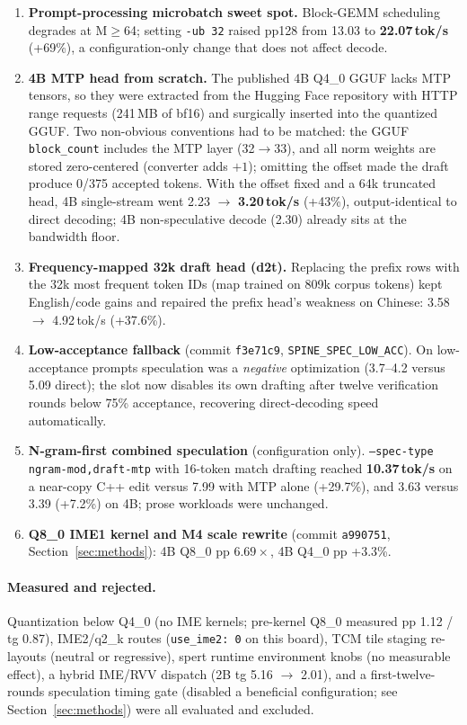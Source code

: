 \documentclass[10pt,twocolumn]{article}
\begin{document}
\begin{enumerate}[label=\textbf{Step \arabic*.},leftmargin=3.2em]
\item \textbf{Prompt-processing microbatch sweet spot.} Block-GEMM scheduling degrades at M$\geq$64; setting \texttt{-ub 32} raised pp128 from 13.03 to \textbf{22.07\,tok/s} (+69\%), a configuration-only change that does not affect decode.
\item \textbf{4B MTP head from scratch.} The published 4B Q4\_0 GGUF lacks MTP tensors, so they were extracted from the Hugging Face repository with HTTP range requests (241\,MB of bf16) and surgically inserted into the quantized GGUF. Two non-obvious conventions had to be matched: the GGUF \texttt{block\_count} includes the MTP layer (32$\to$33), and all norm weights are stored zero-centered (converter adds $+1$); omitting the offset made the draft produce 0/375 accepted tokens. With the offset fixed and a 64k truncated head, 4B single-stream went 2.23 $\to$ \textbf{3.20\,tok/s} (+43\%), output-identical to direct decoding; 4B non-speculative decode (2.30) already sits at the bandwidth floor.
\item \textbf{Frequency-mapped 32k draft head (d2t).} Replacing the prefix rows with the 32k most frequent token IDs (map trained on 809k corpus tokens) kept English/code gains and repaired the prefix head's weakness on Chinese: 3.58 $\to$ 4.92\,tok/s (+37.6\%).
\item \textbf{Low-acceptance fallback} (commit \texttt{f3e71c9}, \texttt{SPINE\_SPEC\_LOW\_ACC}). On low-acceptance prompts speculation was a \emph{negative} optimization (3.7--4.2 versus 5.09 direct); the slot now disables its own drafting after twelve verification rounds below 75\% acceptance, recovering direct-decoding speed automatically.
\item \textbf{N-gram-first combined speculation} (configuration only). \texttt{--spec-type ngram-mod,draft-mtp} with 16-token match drafting reached \textbf{10.37\,tok/s} on a near-copy C++ edit versus 7.99 with MTP alone (+29.7\%), and 3.63 versus 3.39 (+7.2\%) on 4B; prose workloads were unchanged.
\item \textbf{Q8\_0 IME1 kernel and M4 scale rewrite} (commit \texttt{a990751}, Section~\ref{sec:methods}): 4B Q8\_0 pp $6.69\times$, 4B Q4\_0 pp +3.3\%.
\end{enumerate}

\paragraph{Measured and rejected.} Quantization below Q4\_0 (no IME kernels; pre-kernel Q8\_0 measured pp 1.12 / tg 0.87), IME2/q2\_k routes (\texttt{use\_ime2: 0} on this board), TCM tile staging re-layouts (neutral or regressive), spert runtime environment knobs (no measurable effect), a hybrid IME/RVV dispatch (2B tg 5.16 $\to$ 2.01), and a first-twelve-rounds speculation timing gate (disabled a beneficial configuration; see Section~\ref{sec:methods}) were all evaluated and excluded.
\end{document}
